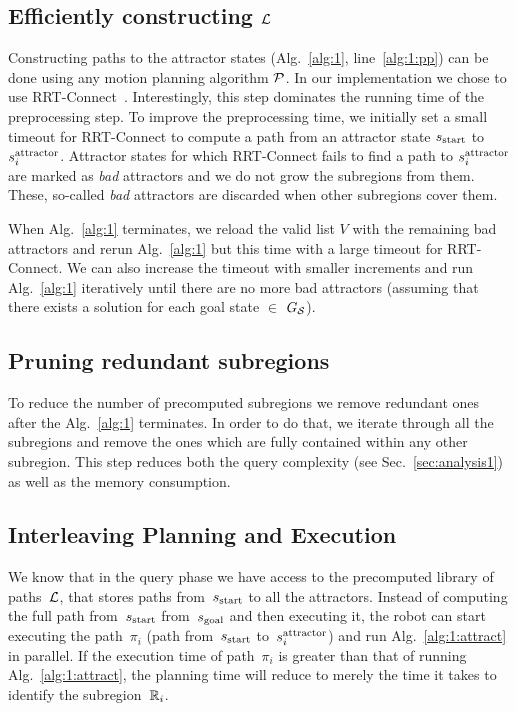 \documentclass[a4paper]{report}
\begin{document}
\subsection{Efficiently constructing $\mathcal{L}$}
Constructing paths to the attractor states (Alg.~\ref{alg:1}, line~\ref{alg:1:pp}) can be done using any motion planning algorithm $\mathcal{P}$.
In our implementation we chose to use RRT-Connect~\cite{KL00}.
Interestingly, this step dominates the running time of the preprocessing step.
%
To improve the preprocessing time, we initially set a small timeout for RRT-Connect to compute a path from an attractor state $s_{\textrm{start}}$ to $s^{\text{attractor}}_i$.
Attractor states for which RRT-Connect fails to find a path to $s^{\text{attractor}}_i$ are marked as \textit{bad} attractors and we do not grow the subregions from them. 
These, so-called \textit{bad} attractors are discarded when other subregions cover them.

When Alg.~\ref{alg:1} terminates, we reload the valid list $V$ with the remaining bad attractors and rerun Alg.~\ref{alg:1} but this time with a large timeout for RRT-Connect. 
%
We can also increase the timeout with smaller increments and run Alg.~\ref{alg:1} iteratively until there are no more bad attractors (assuming that there exists a solution for each goal state $\in$ $G_\mathcal{S}$).


\subsection{Pruning redundant subregions}
To reduce the number of precomputed subregions we remove redundant ones after the Alg.~\ref{alg:1} terminates. 
In order to do that, we iterate through all the subregions and remove the ones which are fully contained within any other subregion. 
This step reduces both the query complexity (see Sec.~\ref{sec:analysis1}) as well as the memory consumption.

\subsection{Interleaving Planning and Execution}
\label{subsubsec:interleave}
We know that in the query phase we have access to the precomputed library of paths~$\mathcal{L}$, that stores paths from~$s_{\text{start}}$ to all the attractors. Instead of computing the full path from~$s_{\text{start}}$ from~$s_{\text{goal}}$ and then executing it, the robot can start executing the path~$\pi_i$ (path from~$s_{\text{start}}$ to~$s^{\text{attractor}}_i$) and run Alg.~\ref{alg:1:attract} in parallel. If the execution time of path~$\pi_i$ is greater than that of running Alg.~\ref{alg:1:attract}, the planning time will reduce to merely the time it takes to identify the subregion~$\mathbb{R}_i$.
\end{document}
